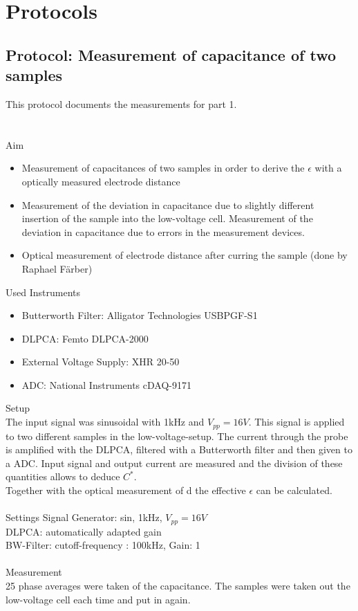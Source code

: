 \chapter{Protocols}
\section{Protocol: Measurement of capacitance of two samples}
This protocol documents the measurements for part 1. \\
\\
\\
{\Large Aim}
\begin{itemize}
\item Measurement of capacitances of two samples in order to derive the $\epsilon$ with a optically measured electrode distance 
\item Measurement of the deviation in capacitance due to slightly different insertion of the sample into the low-voltage cell. Measurement of the deviation in capacitance due to errors in the measurement devices. 
\item Optical measurement of electrode distance after curring the sample (done by Raphael F\"arber)
\end{itemize}
{\Large Used Instruments}
\begin{itemize}
 \item Butterworth Filter: Alligator Technologies USBPGF-S1
 \item DLPCA: Femto DLPCA-2000
 \item External Voltage Supply:  XHR 20-50
 \item ADC: National Instruments cDAQ-9171

\end{itemize}
{\Large Setup}\\
The input signal was  sinusoidal with 1kHz and $V_{pp}=16V$. This signal is applied to two different samples in the low-voltage-setup. The current through the probe is amplified with the DLPCA, filtered with a Butterworth filter and then given to a ADC. 
Input signal and output current are measured and the division of these quantities allows to deduce $C^*$.\\
Together with the optical measurement of d the effective $\epsilon$ can be calculated.\\
\\
{\Large Settings} \newline
Signal Generator:  sin, 1kHz, $V_{pp}=16V$\\
DLPCA:  automatically adapted gain\\
BW-Filter:  cutoff-frequency : 100kHz, Gain: 1\\
\\
{\Large Measurement} \\
25 phase averages were taken of the capacitance. The samples were taken out the low-voltage cell each time and put in again.

